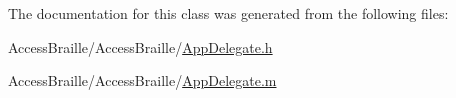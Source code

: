 The documentation for this class was generated from the following files\-:\begin{DoxyCompactItemize}
\item 
Access\-Braille/\-Access\-Braille/\hyperlink{_app_delegate_8h}{App\-Delegate.\-h}\item 
Access\-Braille/\-Access\-Braille/\hyperlink{_app_delegate_8m}{App\-Delegate.\-m}\end{DoxyCompactItemize}
